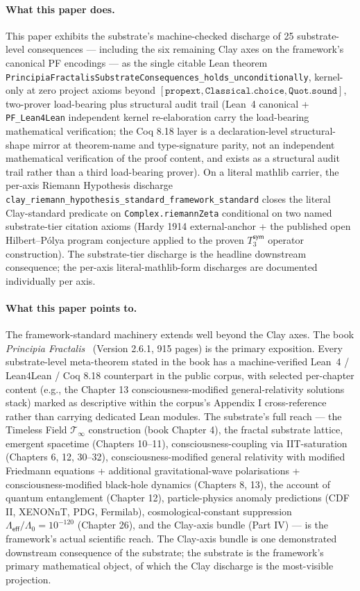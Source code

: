 \documentclass[11pt,a4paper]{amsart}
\theoremstyle{plain}
\theoremstyle{definition}
\begin{document}
\paragraph{What this paper does.} This paper exhibits the substrate's machine-checked discharge of 25 substrate-level consequences --- including the six remaining Clay axes on the framework's canonical PF encodings --- as the single citable Lean theorem \texttt{PrincipiaFractalisSubstrateConsequences\_holds\_unconditionally}, kernel-only at zero project axioms beyond $[\texttt{propext}, \texttt{Classical.choice}, \texttt{Quot.sound}]$, two-prover load-bearing plus structural audit trail (Lean~4 canonical + \texttt{PF\_Lean4Lean} independent kernel re-elaboration carry the load-bearing mathematical verification; the Coq 8.18 layer is a declaration-level structural-shape mirror at theorem-name and type-signature parity, not an independent mathematical verification of the proof content, and exists as a structural audit trail rather than a third load-bearing prover). On a literal mathlib carrier, the per-axis Riemann Hypothesis discharge \texttt{clay\_riemann\_hypothesis\_standard\_framework\_standard} closes the literal Clay-standard predicate on \texttt{Complex.riemannZeta} conditional on two named substrate-tier citation axioms (Hardy 1914 external-anchor + the published open Hilbert--P\'olya program conjecture applied to the proven $T_3^{\textsf{sym}}$ operator construction). The substrate-tier discharge is the headline downstream consequence; the per-axis literal-mathlib-form discharges are documented individually per axis.

\paragraph{What this paper points to.} The framework-standard machinery extends well beyond the Clay axes. The book \emph{Principia Fractalis}~\cite{cohen2026book} (Version 2.6.1, 915 pages) is the primary exposition. Every substrate-level meta-theorem stated in the book has a machine-verified Lean~4 / Lean4Lean / Coq 8.18 counterpart in the public corpus, with selected per-chapter content (e.g., the Chapter 13 consciousness-modified general-relativity solutions stack) marked as descriptive within the corpus's Appendix I cross-reference rather than carrying dedicated Lean modules. The substrate's full reach --- the Timeless Field $\mathcal{T}_\infty$ construction (book Chapter 4), the fractal substrate lattice, emergent spacetime (Chapters 10--11), consciousness-coupling via IIT-saturation (Chapters 6, 12, 30--32), consciousness-modified general relativity with modified Friedmann equations + additional gravitational-wave polarisations + consciousness-modified black-hole dynamics (Chapters 8, 13), the account of quantum entanglement (Chapter 12), particle-physics anomaly predictions (CDF II, XENONnT, PDG, Fermilab), cosmological-constant suppression $\Lambda_{\textsf{eff}}/\Lambda_0 = 10^{-120}$ (Chapter 26), and the Clay-axis bundle (Part IV) --- is the framework's actual scientific reach. The Clay-axis bundle is one demonstrated downstream consequence of the substrate; the substrate is the framework's primary mathematical object, of which the Clay discharge is the most-visible projection.
\end{document}
